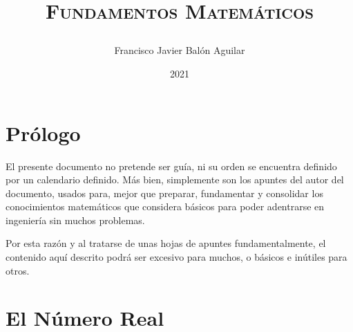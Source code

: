 \documentclass[11pt, oneside, titlepage]{article}
\title{{\scshape\Huge Fundamentos Matemáticos \par}}
\author{Francisco Javier Balón Aguilar}
\date{2021}
\begin{document}
\maketitle
\tableofcontents
\newpage

\section{Prólogo}

    El presente documento no pretende ser guía, ni su orden se encuentra definido por un 
    calendario definido. Más bien, simplemente son los apuntes del autor del documento, usados para,
    mejor que preparar, fundamentar y consolidar los conocimientos matemáticos que considera 
    básicos para poder adentrarse en ingeniería sin muchos problemas.

    Por esta razón y al tratarse de unas hojas de apuntes fundamentalmente, el contenido aquí 
    descrito podrá ser excesivo para muchos, o básicos e inútiles para otros.

\newpage

\section{El Número Real}
\end{document}
